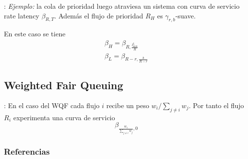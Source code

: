 \documentclass[xcolor={x11names}]{beamer}
\begin{document}
\begin{frame}{\secname: \subsecname}
    \emph{Ejemplo:} la cola de
    prioridad luego atraviesa
    un sistema con curva de servicio
    rate latency $\beta_{R,T}$.
    Además el flujo de prioridad
    $R_H$ es $\gamma_{r,b}$-suave.


    \vfill
    \begin{figure}[h]
        \centering
        
    \end{figure}
    \vfill

    En este caso se tiene
    \begin{align*}
        \beta_H=\beta_{R,\tfrac{l_{\max}^L}{R}}\\
        \beta_L=\beta_{R-r,\tfrac{b}{R-r}}
    \end{align*}


\end{frame}



\subsection{Weighted Fair Queuing}
\begin{frame}{\secname: \subsecname}
    En el caso del WQF cada flujo
    $i$ recibe un peso
    $w_i/\sum_{j\neq i}w_j$.
    Por tanto el flujo $R_i$ experimenta
    una curva de servicio
    \begin{equation*}
        \beta_{\frac{w_i}{\sum_{j\neq i}w_j},0}
    \end{equation*}
\end{frame}




\begin{frame}[allowframebreaks]
        \frametitle{Referencias}
        
        
\end{frame}
\end{document}
